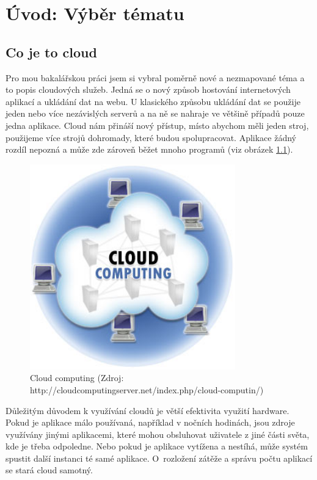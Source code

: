 \chapter{Úvod: Výběr tématu}

\section{Co je to cloud}
Pro mou bakalářskou práci jsem si vybral poměrně nové a nezmapované téma a to popis cloudových služeb. Jedná se o nový způsob hostování internetových aplikací a ukládání dat na webu. U klasického způsobu ukládání dat se použije jeden nebo více nezávislých serverů a na ně se nahraje ve většině případů pouze jedna aplikace. Cloud nám přináší nový přístup, místo abychom měli jeden stroj, použijeme více strojů dohromady, které budou spolupracovat. Aplikace žádný rozdíl nepozná a může zde zároveň běžet mnoho programů (viz obrázek \ref{fig:cloud-computing}). 

\begin{figure}[h]
\begin{center}
\includegraphics[width=3.5in]{figures/cloud-computing.jpg}
\caption[Cloud computing]{Cloud computing 
(Zdroj: http://cloudcomputingserver.net/index.php/cloud-computin/)}
\label{fig:cloud-computing}
\end{center}
\end{figure}


Důležitým důvodem k využívání cloudů je větší efektivita využití hardware. Pokud je aplikace málo používaná, například v nočních hodinách, jsou zdroje využívány jinými aplikacemi, které mohou obsluhovat uživatele z jiné části světa, kde je třeba odpoledne. Nebo pokud je aplikace vytížena a nestíhá, může systém spustit další instanci té samé aplikace. O~rozložení zátěže a správu počtu aplikací se stará cloud samotný.

